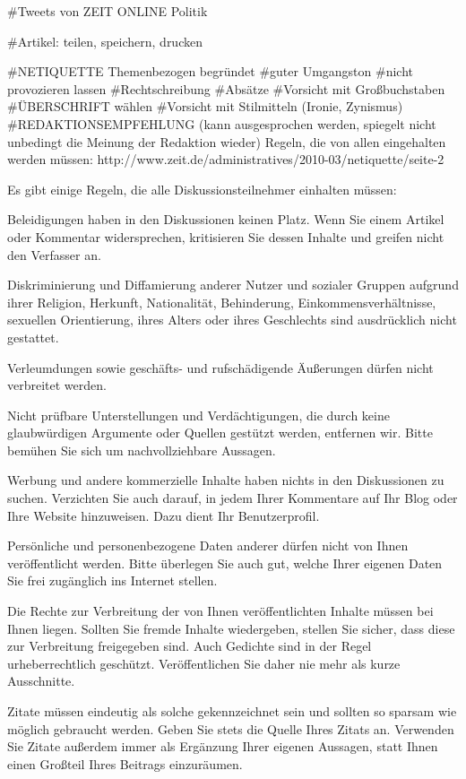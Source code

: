 #Tweets von ZEIT ONLINE Politik

#Artikel: teilen, speichern, drucken

#NETIQUETTE
Themenbezogen
begründet
#guter Umgangston 
#nicht provozieren lassen
#Rechtschreibung
#Absätze
#Vorsicht mit Großbuchstaben 
#ÜBERSCHRIFT wählen
#Vorsicht mit Stilmitteln (Ironie, Zynismus)
#REDAKTIONSEMPFEHLUNG (kann ausgesprochen werden, spiegelt nicht unbedingt die Meinung der Redaktion wieder)
Regeln, die von allen eingehalten werden müssen:
http://www.zeit.de/administratives/2010-03/netiquette/seite-2
 
 Es gibt einige Regeln, die alle Diskussionsteilnehmer einhalten müssen:
 
 Beleidigungen haben in den Diskussionen keinen Platz. Wenn Sie einem Artikel oder Kommentar widersprechen, kritisieren Sie dessen Inhalte und greifen nicht den Verfasser an.

Diskriminierung und Diffamierung anderer Nutzer und sozialer Gruppen aufgrund ihrer Religion, Herkunft, Nationalität, Behinderung, Einkommensverhältnisse, sexuellen Orientierung, ihres Alters oder ihres Geschlechts sind ausdrücklich nicht gestattet.

Verleumdungen sowie geschäfts- und rufschädigende Äußerungen dürfen nicht verbreitet werden.

Nicht prüfbare Unterstellungen und Verdächtigungen, die durch keine glaubwürdigen Argumente oder Quellen gestützt werden, entfernen wir. Bitte bemühen Sie sich um nachvollziehbare Aussagen.

Werbung und andere kommerzielle Inhalte haben nichts in den Diskussionen zu suchen. Verzichten Sie auch darauf, in jedem Ihrer Kommentare auf Ihr Blog oder Ihre Website hinzuweisen. Dazu dient Ihr Benutzerprofil.

Persönliche und personenbezogene Daten anderer dürfen nicht von Ihnen veröffentlicht werden. Bitte überlegen Sie auch gut, welche Ihrer eigenen Daten Sie frei zugänglich ins Internet stellen.

Die Rechte zur Verbreitung der von Ihnen veröffentlichten Inhalte müssen bei Ihnen liegen. Sollten Sie fremde Inhalte wiedergeben, stellen Sie sicher, dass diese zur Verbreitung freigegeben sind. Auch Gedichte sind in der Regel urheberrechtlich geschützt. Veröffentlichen Sie daher nie mehr als kurze Ausschnitte.

Zitate müssen eindeutig als solche gekennzeichnet sein und sollten so sparsam wie möglich gebraucht werden. Geben Sie stets die Quelle Ihres Zitats an. Verwenden Sie Zitate außerdem immer als Ergänzung Ihrer eigenen Aussagen, statt Ihnen einen Großteil Ihres Beitrags einzuräumen.

